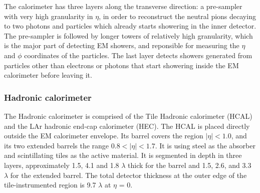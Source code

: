 	The calorimeter has three layers along the transverse direction:
	a pre-sampler with very high granularity in $\eta$, in order to 
	reconstruct the neutral pions decaying to two photons and particles 
	which already starts showering in the inner detector. 
	The pre-sampler is followed by longer towers of relatively 
	high granularity, which is the major part of detecting EM showers, 
	and reponsible for measuring the $\eta$ and $\phi$ coordinates of 
	the particles. The last layer detects showers generated from 
	particles other than electrons or photons that start showering 
	inside the EM calorimeter before leaving it.

	\subsubsection{Hadronic calorimeter}
	The Hadronic calorimeter is comprised of the Tile Hadronic calorimeter (HCAL) 
	and the LAr hadronic end-cap calorimeter (HEC). 
	The HCAL is placed directly outside the EM calorimeter envelope. 
	Its	barrel covers the region $|\eta|< 1.0$, and its two extended barrels 
	the range $0.8 < |\eta|< 1.7$. It is using steel as the absorber and scintillating tiles
	as the active material. 
	It is segmented in depth in three layers, approximately 1.5, 4.1 and 1.8 $\lambda$ 
	thick for the barrel and 1.5, 2.6, and 3.3 $\lambda$ for the extended barrel. 
	The total detector thickness at the outer edge of the tile-instrumented
	region is 9.7 $\lambda$ at $\eta$ = 0. 
	
